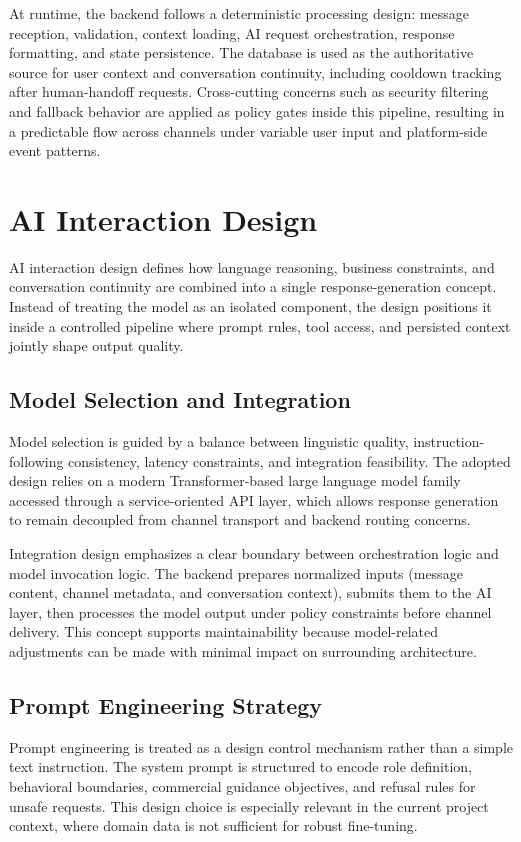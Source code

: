 At runtime, the backend follows a deterministic processing design: message reception, validation, context loading, AI request orchestration, response formatting, and state persistence. The database is used as the authoritative source for user context and conversation continuity, including cooldown tracking after human-handoff requests. Cross-cutting concerns such as security filtering and fallback behavior are applied as policy gates inside this pipeline, resulting in a predictable flow across channels under variable user input and platform-side event patterns.

\section{AI Interaction Design}
AI interaction design defines how language reasoning, business constraints, and conversation continuity are combined into a single response-generation concept. Instead of treating the model as an isolated component, the design positions it inside a controlled pipeline where prompt rules, tool access, and persisted context jointly shape output quality.

\subsection{Model Selection and Integration}
Model selection is guided by a balance between linguistic quality, instruction-following consistency, latency constraints, and integration feasibility. The adopted design relies on a modern Transformer-based large language model family\cite{vaswani2017attention} accessed through a service-oriented API layer, which allows response generation to remain decoupled from channel transport and backend routing concerns.

Integration design emphasizes a clear boundary between orchestration logic and model invocation logic. The backend prepares normalized inputs (message content, channel metadata, and conversation context), submits them to the AI layer, then processes the model output under policy constraints before channel delivery. This concept supports maintainability because model-related adjustments can be made with minimal impact on surrounding architecture.

\subsection{Prompt Engineering Strategy}
Prompt engineering is treated as a design control mechanism rather than a simple text instruction. The system prompt is structured to encode role definition, behavioral boundaries, commercial guidance objectives, and refusal rules for unsafe requests\cite{liu2023prompting_survey}. This design choice is especially relevant in the current project context, where domain data is not sufficient for robust fine-tuning.

